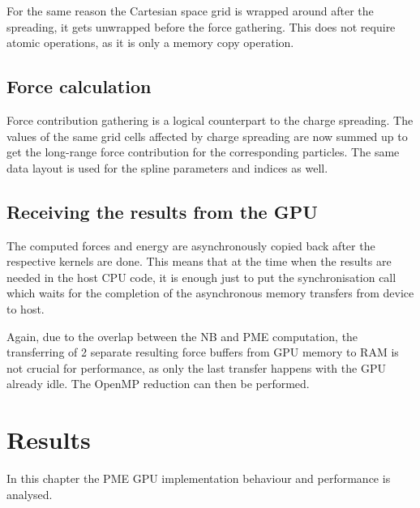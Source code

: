 \documentclass[12pt,a4paper]{report}
\newcommand{\draft}[1]{#1}
\begin{document}
For the same reason the Cartesian space grid is wrapped around after the spreading, it gets unwrapped before the force gathering. This does not require atomic operations, as it is only a memory copy operation.

\section{Force calculation}
Force contribution gathering is a logical counterpart to the charge spreading. The values of the same grid cells affected by charge spreading are now summed up to get the long-range force contribution for the corresponding particles.
The same data layout is used for the spline parameters and indices as well.


\section{Receiving the results from the GPU}
The computed forces and energy are asynchronously copied back after the respective kernels are done. This means that at the time when the results are needed in the host CPU code, it is enough just to put the synchronisation call which waits for the completion of the asynchronous memory transfers from device to host.

Again, due to the overlap between the NB and PME computation, the transferring of 2 separate resulting force buffers from GPU memory to RAM is not crucial for performance, as only the last transfer happens with the GPU already idle. The OpenMP reduction can then be performed.

\newpage
\chapter{Results}

In this chapter the PME GPU implementation behaviour and performance is analysed.

\end{document}
